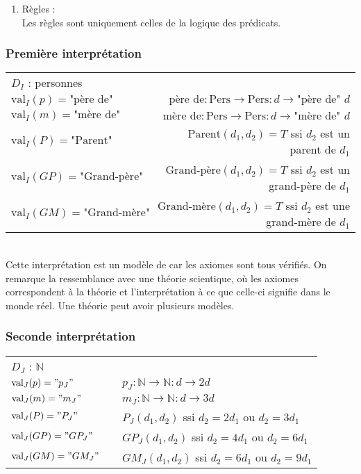 {\begin{enumerate}
\item Règles : \\
Les règles sont uniquement celles de la logique des prédicats.
\end{enumerate}

\subsubsection{Première interprétation}
\begin{tabular}{@{}llr}
$D_I$ : personnes&&\\
$\text{val}_I(p)=\text{"père de"}$ & &$\text{père de} : \text{Pers}\rightarrow\text{Pers} : d \rightarrow \text{"père de" }d$\\
$\text{val}_I(m)=\text{"mère de"}$ & &$\text{mère de} : \text{Pers}\rightarrow\text{Pers} : d \rightarrow \text{"mère de" }d$\\
$\text{val}_I(P)=\text{"Parent"}$ & &$\text{Parent}(d_1,d_2)=T$ ssi $d_2$ est un parent de $d_1$\\
$\text{val}_I(GP)=\text{"Grand-père"}$ & &$\text{Grand-père}(d_1,d_2)=T$ ssi $d_2$ est un grand-père de $d_1$\\
$\text{val}_I(GM)=\text{"Grand-mère"}$ & &$\text{Grand-mère}(d_1,d_2)=T$ ssi $d_2$ est une grand-mère de $d_1$\\
\end{tabular}\\

Cette interprétation est un modèle de  car les axiomes sont tous vérifiés.
On remarque la ressemblance avec une théorie scientique, où les axiomes correspondent à la théorie
et l'interprétation à ce que celle-ci signifie dans le monde réel.
Une théorie peut avoir plusieurs modèles.

\subsubsection{Seconde interprétation}

\begin{tabular}{lll}
$D_J$ : $\mathbb{N}$&&\\
$\text{val}_J(p)="p_J"$ &\hspace*{1cm} &$p_J : \mathbb{N}\rightarrow\mathbb{N} : d \rightarrow 2d$\\
$\text{val}_J(m)="m_J"$ &\hspace*{1cm} &$m_J : \mathbb{N}\rightarrow\mathbb{N} : d \rightarrow 3d$\\
$\text{val}_J(P)="P_J"$ &\hspace*{1cm} &$P_J(d_1,d_2)$ ssi $d_2=2d_1$ ou $d_2=3d_1$\\
$\text{val}_J(GP)="GP_J"$ &\hspace*{1cm} &$GP_J(d_1,d_2)$ ssi $d_2=4d_1$ ou $d_2=6d_1$\\
$\text{val}_J(GM)="GM_J"$ &\hspace*{1cm} &$GM_J(d_1,d_2)$ ssi $d_2=6d_1$ ou $d_2=9d_1$\\
\end{tabular}\\

}
